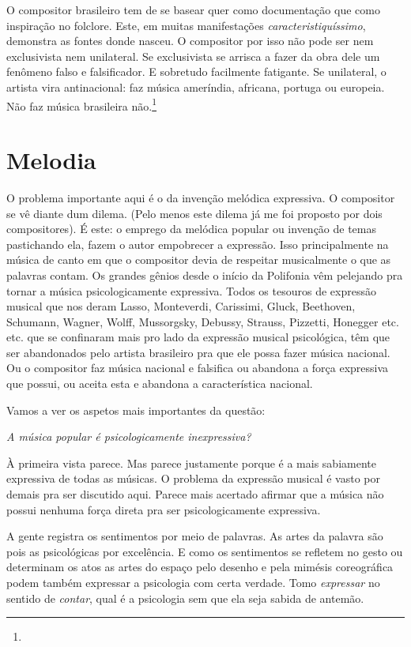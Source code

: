 O compositor brasileiro tem de se basear quer como documentação que como
inspiração no folclore. Este, em muitas manifestações
\textit{caracteristiquíssimo}, demonstra as fontes donde nasceu. O compositor por
isso não pode ser nem exclusivista nem unilateral. Se exclusivista se
arrisca a fazer da obra dele um fenômeno falso e falsificador. E
sobretudo facilmente fatigante. Se unilateral, o artista vira
antinacional: faz música ameríndia, africana, portuga ou europeia. Não
faz música brasileira não.\footnote{}

\section{Melodia}

O problema importante aqui é o da invenção melódica expressiva. O
compositor se vê diante dum dilema. (Pelo menos este dilema já me foi
proposto por dois compositores). É este: o emprego da melódica popular
ou invenção de temas pastichando ela, fazem o autor empobrecer a
expressão. Isso principalmente na música de canto em que o compositor
devia de respeitar musicalmente o que as palavras contam. Os grandes
gênios desde o início da Polifonia vêm pelejando pra tornar a música
psicologicamente expressiva. Todos os tesouros de expressão musical que
nos deram Lasso, Monteverdi, Carissimi, Gluck, Beethoven, Schumann,
Wagner, Wolff, Mussorgsky, Debussy, Strauss, Pizzetti, Honegger etc.
etc. que se confinaram mais pro lado da expressão musical psicológica,
têm que ser abandonados pelo artista brasileiro pra que ele possa fazer
música nacional. Ou o compositor faz música nacional e falsifica ou
abandona a força expressiva que possui, ou aceita esta e abandona a
característica nacional.

Vamos a ver os aspetos mais importantes da questão:

\smallskip
\textit{A música popular é psicologicamente inexpressiva?}
\smallskip

À primeira vista parece. Mas parece justamente porque é a mais
sabiamente expressiva de todas as músicas. O problema da expressão
musical é vasto por demais pra ser discutido aqui. Parece mais acertado
afirmar que a música não possui nenhuma força direta pra ser
psicologicamente expressiva.

A gente registra os sentimentos por meio de palavras. As artes da
palavra são pois as psicológicas por excelência. E como os sentimentos
se refletem no gesto ou determinam os atos as artes do espaço pelo
desenho e pela mimésis coreográfica podem também expressar a psicologia
com certa verdade. Tomo \textit{expressar} no sentido de \textit{contar}, qual é a
psicologia sem que ela seja sabida de antemão.

